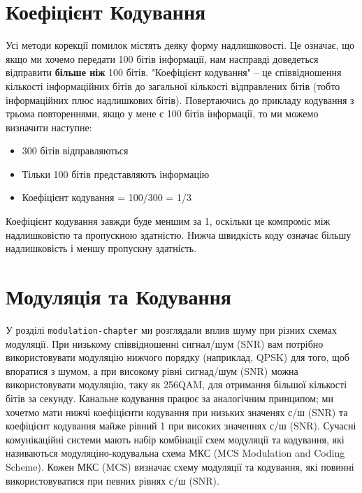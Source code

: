 \section{Коефіцієнт
Кодування}\label{ux43aux43eux435ux444ux456ux446ux456ux454ux43dux442-ux43aux43eux434ux443ux432ux430ux43dux43dux44f}

Усі методи корекції помилок містять деяку форму надлишковості. Це
означає, що якщо ми хочемо передати 100 бітів інформації, нам насправді
доведеться відправити \textbf{більше ніж} 100 бітів. "Коефіцієнт
кодування" -- це співвідношення кількості інформаційних бітів до
загальної кількості відправлених бітів (тобто інформаційних плюс
надлишкових бітів). Повертаючись до прикладу кодування з трьома
повтореннями, якщо у мене є 100 бітів інформації, то ми можемо визначити
наступне:

\begin{itemize}
\tightlist
\item
  300 бітів відправляються
\item
  Тільки 100 бітів представляють інформацію
\item
  Коефіцієнт кодування = 100/300 = 1/3
\end{itemize}

Коефіцієнт кодування завжди буде меншим за 1, оскільки це компроміс між
надлишковістю та пропускною здатністю. Нижча швидкість коду означає
більшу надлишковість і меншу пропускну здатність.

\section{Модуляція та
Кодування}\label{ux43cux43eux434ux443ux43bux44fux446ux456ux44f-ux442ux430-ux43aux43eux434ux443ux432ux430ux43dux43dux44f}

У розділі \texttt{modulation-chapter} ми розглядали вплив шуму при
різних схемах модуляції. При низькому співвідношенні сигнал/шум (SNR)
вам потрібно використовувати модуляцію нижчого порядку (наприклад, QPSK)
для того, щоб впоратися з шумом, а при високому рівні сигнад/шум (SNR)
можна використовувати модуляцію, таку як 256QAM, для отримання більшої
кількості бітів за секунду. Канальне кодування працює за аналогічним
принципом; ми хочетмо мати нижчі коефіцієнти кодування при низьких
значенях с/ш (SNR) та коефіцієнт кодування майже рівний 1 при високих
значеннях с/ш (SNR). Сучасні комунікаційні системи мають набір
комбінації схем модуляції та кодування, які називаються
модуляціно-кодувальна схема МКС (MCS Modulation and Coding Scheme).
Кожен МКС (MCS) визначає схему модуляції та кодування, які повинні
використовуватися при певних рівнях с/ш (SNR).

